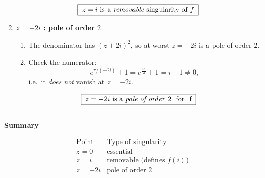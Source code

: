 \documentclass[12pt]{article}
\theoremstyle{definition} %
\theoremstyle{plain} %
\begin{document}
\begin{enumerate}[label=\textbf{\arabic*.},leftmargin=*]
  \[
  \boxed{\;
     z=i \text{ is a \emph{removable} singularity of } f
   \;}
  \]
  
  \item \textbf{$z=-2i$ : pole of order $2$}
  
  \begin{enumerate}[label=(\alph*)]
  \item The denominator has $(z+2i)^{2}$, so at worst $z=-2i$ is a pole
        of order $2$.
  \item Check the numerator:
        \[
        e^{\pi/(-2i)}+1
        =e^{\,\frac{i\pi}{2}}+1
        =i+1\neq0,
        \]
        i.e.\ it \emph{does not} vanish at $z=-2i$.
  \end{enumerate}
  
  \[
  \boxed{\;
     z=-2i \text{ is a \emph{pole of order }2 \text{ for } f}
   \;}
  \]
  
  \end{enumerate}
  
  \bigskip
  \hrule
  \bigskip
  \noindent
  \textbf{Summary}
  
  \[
  \boxed{
  \begin{array}{c|c}
  \text{Point} & \text{Type of singularity}\\\hline
  z=0      & \text{essential}\\
  z=i      & \text{removable (defines }f(i)\text{)}\\
  z=-2i    & \text{pole of order }2
  \end{array}}
  \]
  \pagebreak
%
\end{document}
